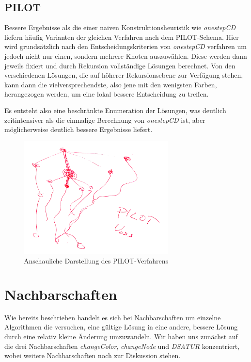 \subsection{PILOT}

Bessere Ergebnisse als die einer naiven Konstruktionsheuristik wie \textit{onestepCD} liefern häufig Varianten der gleichen Verfahren nach dem PILOT-Schema. Hier  wird grundsätzlich nach den Entscheidungskriterien von \textit{onestepCD} verfahren um jedoch nicht nur einen, sondern mehrere Knoten auszuwählen. Diese werden dann jeweils fixiert und durch Rekursion vollständige Lösungen berechnet. Von den verschiedenen Lösungen, die auf höherer Rekursionsebene zur Verfügung stehen, kann dann die vielversprechendste, also jene mit den wenigsten Farben, herangezogen werden, um eine lokal bessere Entscheidung zu treffen.

Es entsteht also eine beschränkte Enumeration der Lösungen, was deutlich zeitintensiver als die einmalige Berechnung von \textit{onestepCD} ist, aber möglicherweise deutlich bessere Ergebnisse liefert.

\begin{figure}
	\centering
	\includegraphics[width=0.7\textwidth]{../img/pilot}
	\caption{Anschauliche Darstellung des PILOT-Verfahrens}
	\label{fig:pilot}
\end{figure}

\section{Nachbarschaften}
\label{sec:neigh}
Wie bereits beschrieben handelt es sich bei Nachbarschaften um einzelne Algorithmen die versuchen, eine gültige Lösung in eine andere, bessere Lösung durch eine relativ kleine Änderung umzuwandeln. Wir haben uns zunächst auf die drei Nachbarschaften \emph{changeColor}, \emph{changeNode} und \emph{DSATUR} konzentriert, wobei weitere Nachbarschaften noch zur Diskussion stehen.

